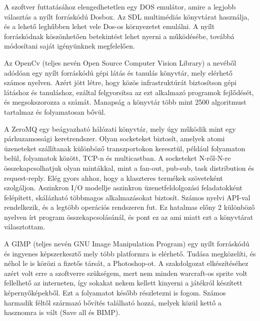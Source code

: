 

A szoftver futtatásához elengedhetetlen egy DOS emulátor, amire a legjobb választás a nyílt forráskódú Dosbox. Az SDL multimédiás könyvtárat használja, és a lehető leghűbben lehet vele Dos-os környezetet emulálni. A nyílt forráskódnak köszönhetően betekintést lehet nyerni a működésébe, továbbá módosítani saját igényünknek megfelelően. 


Az OpenCv (teljes nevén Open Source Computer Vision Library) a nevéből adódóan egy nyílt forráskódú gépi látás és tanulás könyvtár, mely elérhető számos nyelven. Azért jött létre, hogy közös infrastruktúrát biztosítson gépi látáshoz és tanuláshoz, ezáltal felgyorsítsa az ezt alkalmazó programok fejlődését, és megsokszorozza a számát. Manapság a könyvtár több mint 2500 algoritmust tartalmaz és folyamatosan bővül.


A ZeroMQ egy beágyazható hálózati könyvtár, mely úgy működik mint egy párhuzamossági keretrendszer. Olyan socketeket biztosít, amelyek atomi üzeneteket szállítanak különböző transzportokon keresztül, például folyamaton belül, folyamatok között, TCP-n és multicastban. A socketeket N-ről-N-re összekapcsolhatjuk olyan mintákkal, mint a fan-out, pub-sub, task distribution és request-reply. Elég gyors ahhoz, hogy a klaszteres termékek szöveteként szolgáljon. Aszinkron I/O modellje aszinkron üzenetfeldolgozási feladatokként felépített, skálázható többmagos alkalmazásokat biztosít. Számos nyelvi API-val rendelkezik, és a legtöbb operációs rendszeren fut. Ez hatalmas előny 2 különböző nyelven írt program összekapcsolásánál, és pont ez az ami miatt ezt a könyvtárat választottam.


A GIMP (teljes nevén GNU Image Manipulation Program) egy nyílt forráskódú és ingyenes képszerkesztő mely több platformra is elérhető. Tudása megközelíti, és néhol le is körözi a fizetős társát, a Photoshop-ot. A szakdolgozat elkészítéséhez azért volt erre a szoftverre szükségem, mert nem minden warcraft-os sprite volt fellelhető az interneten, így sokakat nekem kellett kinyerni a játékról készített képernyőképekből. Ezt a folyamatot később részletezni is fogom. Számos harmadik féltől származó bővítés található hozzá, melyek közül kettő a hasznomra is vált (Save all és BIMP).

\iffalse
\Section{Python}

asd

\Section{Numpy}

asd

\Section{Pyteserract}

asd
\fi
